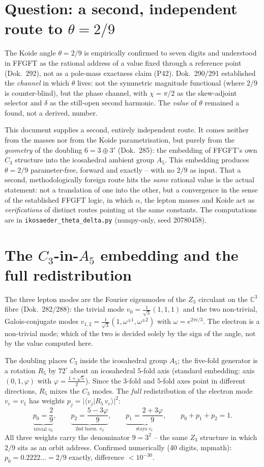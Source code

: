 \section{Question: a second, independent route to $\theta=2/9$}
The Koide angle $\theta=2/9$ is empirically confirmed to seven digits and understood in FFGFT as
the rational address of a value fixed through a reference point (Dok.~292), not as a pole-mass
exactness claim (P42). Dok.~290/291 established the \emph{channel} in which $\theta$ lives: not
the symmetric magnitude functional (where $2/9$ is counter-blind), but the phase channel, with
$\chi=\pi/2$ as the skew-adjoint selector and $\delta$ as the still-open second harmonic. The
\emph{value} of $\theta$ remained a found, not a derived, number.

This document supplies a second, entirely independent route. It comes neither from the masses nor
from the Koide parametrisation, but purely from the \emph{geometry} of the doubling $6=3\oplus3'$
(Dok.~285): the embedding of FFGFT's own $C_3$ structure into the icosahedral ambient group
$A_5$. This embedding produces $\theta=2/9$ parameter-free, forward and exactly -- with no $2/9$
as input. That a second, methodologically foreign route hits the \emph{same} rational value is
the actual statement: not a translation of one into the other, but a convergence in the sense of
the established FFGFT logic, in which $\alpha$, the lepton masses and Koide act as
\emph{verifications} of distinct routes pointing at the same constants. The computations are in
\texttt{ikosaeder\_theta\_delta.py} (numpy-only, seed 20780458).

\section{The $C_3$-in-$A_5$ embedding and the full redistribution}
The three lepton modes are the Fourier eigenmodes of the $Z_3$ circulant on the $\mathbb{C}^3$
fibre (Dok.~282/288): the trivial mode $v_0=\tfrac{1}{\sqrt3}(1,1,1)$ and the two non-trivial,
Galois-conjugate modes $v_{1,2}=\tfrac{1}{\sqrt3}(1,\omega^{\pm1},\omega^{\pm2})$ with
$\omega=e^{2\pi i/3}$. The electron is a non-trivial mode; which of the two is decided solely by
the sign of the angle, not by the value computed here.

The doubling places $C_3$ inside the icosahedral group $A_5$; the five-fold generator is a
rotation $R_5$ by $72^\circ$ about an icosahedral $5$-fold axis (standard embedding: axis
$(0,1,\varphi)$ with $\varphi=\tfrac{1+\sqrt5}{2}$). Since the $3$-fold and $5$-fold axes point
in different directions, $R_5$ mixes the $C_3$ modes. The \emph{full} redistribution of the
electron mode $v_e=v_1$ has weights $p_j=\lvert\langle v_j\vert R_5\,v_e\rangle\rvert^2$:
\[
\underbrace{p_0=\frac{2}{9}}_{\text{trivial }v_0},\qquad
\underbrace{p_2=\frac{5-3\varphi}{9}}_{\text{2nd harm.\ }v_2},\qquad
\underbrace{p_1=\frac{2+3\varphi}{9}}_{\text{stays }v_e},\qquad p_0+p_1+p_2=1.
\]
All three weights carry the denominator $9=3^2$ -- the same $Z_3$ structure in which $2/9$ sits
as an orbit address. Confirmed numerically (40 digits, mpmath): $p_0=0.2222\ldots=2/9$ exactly,
difference $<10^{-30}$.

